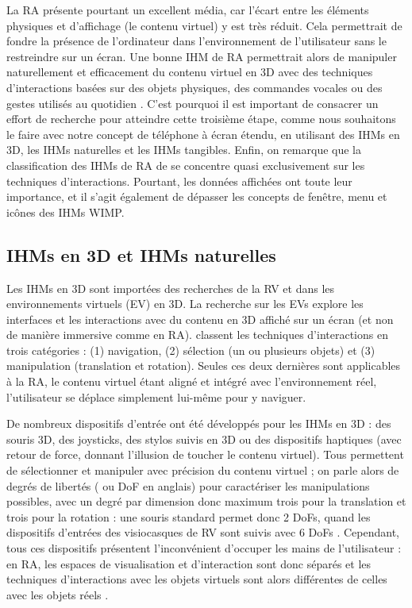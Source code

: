 La RA présente pourtant un excellent média, car l'écart entre les éléments physiques et d'affichage (le contenu virtuel) y est très réduit. Cela permettrait de fondre la présence de l'ordinateur dans l'environnement de l'utilisateur sans le restreindre sur un écran. Une bonne IHM de RA permettrait alors de manipuler naturellement et efficacement du contenu virtuel en 3D avec des techniques d'interactions basées sur des objets physiques, des commandes vocales ou des gestes utilisés au quotidien \citep{Billinghurst2005}. C'est pourquoi il est important de consacrer un effort de recherche pour atteindre cette troisième étape, comme nous souhaitons le faire avec notre concept de téléphone à écran étendu, en utilisant des IHMs en 3D, les IHMs naturelles et les IHMs tangibles. Enfin, on remarque que la classification des IHMs de RA de \cite{Billinghurst2015} se concentre quasi exclusivement sur les techniques d'interactions. Pourtant, les données affichées ont toute leur importance, et il s'agit également de dépasser les concepts de fenêtre, menu et icônes des IHMs WIMP.

\subsection{IHMs en 3D et IHMs naturelles}
\label{subsec:litterature_ar_hci_interactions}

Les IHMs en 3D sont importées des recherches de la RV et dans les environnements virtuels (EV) en 3D. La recherche sur les EVs explore les interfaces et les interactions avec du contenu en 3D affiché sur un écran (et non de manière immersive comme en RA). \cite{Bowman2004} classent les techniques d'interactions en trois catégories : (1) navigation, (2) sélection (un ou plusieurs objets) et (3) manipulation (translation et rotation). Seules ces deux dernières sont applicables à la RA, le contenu virtuel étant aligné et intégré avec l'environnement réel, l'utilisateur se déplace simplement lui-même pour y naviguer.

De nombreux dispositifs d'entrée ont été développés pour les IHMs en 3D : des souris 3D, des joysticks, des stylos suivis en 3D ou des dispositifs haptiques (avec retour de force, donnant l'illusion de toucher le contenu virtuel). Tous permettent de sélectionner et manipuler avec précision du contenu virtuel ; on parle alors de degrés de libertés ( ou DoF en anglais) pour caractériser les manipulations possibles, avec un degré par dimension donc maximum trois pour la translation et trois pour la rotation : une souris standard permet donc 2 DoFs, quand les dispositifs d'entrées des visiocasques de RV sont suivis avec 6 DoFs . Cependant, tous ces dispositifs présentent l'inconvénient d'occuper les mains de l'utilisateur : en RA, les espaces de visualisation et d'interaction sont donc séparés  et les techniques d'interactions avec les objets virtuels sont alors différentes de celles avec les objets réels \cite{Billinghurst2015}.

